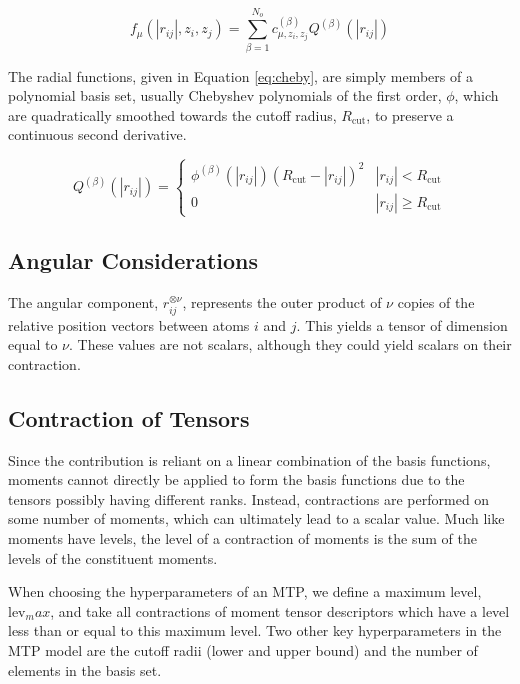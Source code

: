 \documentclass[9pt,twocolumn,twoside]{opticajnl}
\begin{document}
\begin{equation} \label{eq:radial}
  f_\mu (|r_{ij}|,z_i,z_j) = \sum ^ {N_o} _ {\beta = 1} c^{(\beta)} _ {\mu,z_i,z_j}  Q^{(\beta)}(|r_{ij}|)
\end{equation}

The radial functions, given in Equation \ref{eq:cheby}, are simply members of a polynomial basis set, usually Chebyshev polynomials of the first order, $\phi$, which are quadratically smoothed towards the cutoff radius, $R_{\textrm{cut}}$, to preserve a continuous second derivative.

\begin{equation} \label{eq:cheby}
  Q^{(\beta)}(|r_{ij}|)=  \begin{cases}
    \phi ^{(\beta)}(|r_{ij}|) (R_{\textrm{cut}} - |r_{ij}|)^2& |r_{ij}| < R_{\textrm{cut}} \\
    0 & |r_{ij}| \geq R_{\textrm{cut}} 
\end{cases}
\end{equation}

\subsection{Angular Considerations}
The angular component, $r_{ij} ^{\otimes \nu}$, represents the outer product of $\nu$ copies of the relative position vectors between atoms $i$ and $j$. This yields a tensor of dimension equal to $\nu$. These values are not scalars, although they could yield scalars on their contraction.

\subsection{Contraction of Tensors}
Since the contribution is reliant on a linear combination of the basis functions, moments cannot directly be applied to form the basis functions due to the tensors possibly having different ranks. Instead, contractions are performed on some number of moments, which can ultimately lead to a scalar value. Much like moments have levels, the level of a contraction of moments is the sum of the levels of the constituent moments.

When choosing the hyperparameters of an MTP, we define a maximum level, $\textrm{lev}_max$, and take all contractions of moment tensor descriptors which have a level less than or equal to this maximum level. Two other key hyperparameters in the MTP model are the cutoff radii (lower and upper bound) and the number of elements in the basis set.
\end{document}

